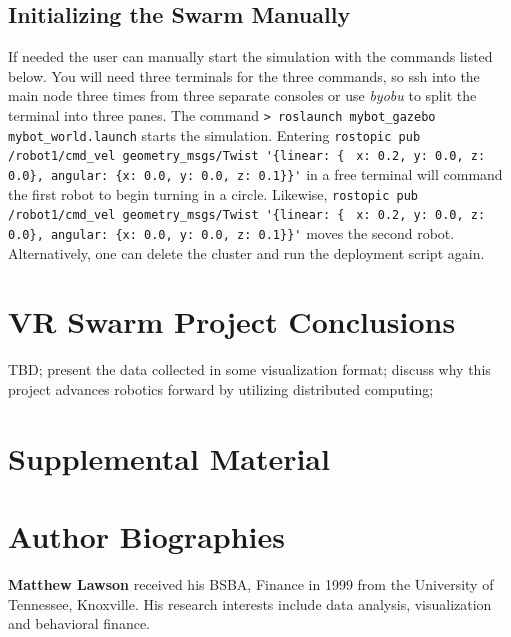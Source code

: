 \documentclass[9pt,twocolumn,twoside]{../../styles/osajnl}
\begin{document}
\subsection{Initializing the Swarm Manually}
If needed the user can manually start the simulation with the commands listed below.  You will need three terminals for the three commands, so ssh into the main node three times from three separate consoles or use \textit{byobu} to split the terminal into three panes.  The command {\color{green} \lstinline[style=BashInputStyle]!> roslaunch mybot_gazebo mybot_world.launch! } starts the simulation.  Entering {\color{green} \lstinline[style=BashInputStyle]!rostopic pub /robot1/cmd_vel geometry_msgs/Twist '{linear: { !} {\color{green} \lstinline[style=BashInputStyle]!x: 0.2, y: 0.0, z: 0.0}, angular: {x: 0.0, y: 0.0, z: 0.1}}'! } \newline in a free terminal will command the first robot to begin turning in a circle.  Likewise, {\color{green} \lstinline[style=BashInputStyle]!rostopic pub /robot1/cmd_vel geometry_msgs/Twist '{linear: { !} {\color{green} \lstinline[style=BashInputStyle]!x: 0.2, y: 0.0, z: 0.0}, angular: {x: 0.0, y: 0.0, z: 0.1}}'! } \newline moves the second robot. Alternatively, one can delete the cluster and run the deployment script again.


\section{VR Swarm Project Conclusions}
TBD; present the data collected in some visualization format; discuss why this project advances robotics forward by utilizing distributed computing;

\section{Supplemental Material}



 
\section*{Author Biographies}
\begingroup
\setlength\intextsep{0pt}
\begin{minipage}[t][3.2cm][t]{1.0\columnwidth} %
  \noindent
  {\bfseries Matthew Lawson} received his BSBA, Finance in 1999 from
  the University of Tennessee, Knoxville. His research interests include
  data analysis, visualization and behavioral finance.
\end{minipage}
\endgroup
\end{document}
